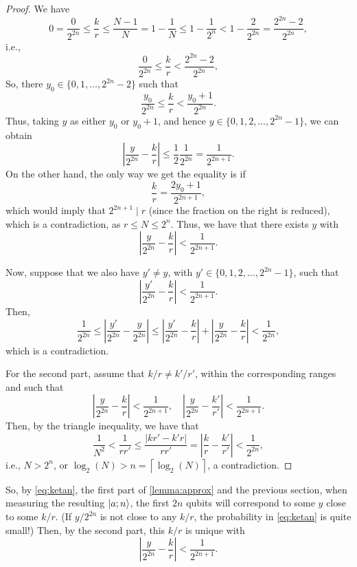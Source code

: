 \documentclass[12pt]{amsart}
\theoremstyle{plain}
\theoremstyle{definition}
\theoremstyle{remark}
\newcommand{\abs}[1]{\left| #1 \right|}
\newcommand{\ceil}[1]{\left\lceil{#1}\right\rceil}
\begin{document}
\begin{proof}
  We have
  \[
    0 = \frac{0}{2^{2n}} \leq \frac{k}{r} \leq \frac{N-1}{N} = 1 - \frac{1}{N} \leq 1 -  \frac{1}{2^n} < 1 - \frac{2}{2^{2n}} = \frac{2^{2n} - 2}{2^{2n}},
  \]
  i.e.,
  \[
     \frac{0}{2^{2n}} \leq \frac{k}{r} < \frac{2^{2n} - 2}{2^{2n}},
  \]
  So, there $y_0 \in \{0, 1, \ldots, 2^{2n}-2\}$ such that
  \[
    \frac{y_0}{2^{2n}} \leq \frac{k}{r} < \frac{y_0+1}{2^{2n}}.
  \]
  Thus, taking $y$ as either $y_0$ or $y_0 + 1$, and hence $y \in \{0, 1, 2, \ldots, 2^{2n} -1 \}$, we can obtain
  \[
    \abs{\frac{y}{2^{2n}} - \frac{k}{r}} \leq \frac{1}{2} \frac{1}{2^{2n}} = \frac{1}{2^{2n+1}}.
  \]
  On the other hand, the only way we get the equality is if
  \[
    \frac{k}{r} = \frac{2y_0 + 1}{2^{2n+1}},
  \]
  which would imply that $2^{2n+1} \mid r$ (since the fraction on the right is reduced), which is a contradiction, as $r \leq N \leq 2^{n}$.  Thus, we have that there exists $y$ with
  \[
    \abs{\frac{y}{2^{2n}} - \frac{k}{r}} < \frac{1}{2^{2n+1}}.
  \]

  Now, suppose that we also have $y' \neq y$, with $y' \in \{0, 1, 2, \ldots, 2^{2n}-1\}$, such that
  \[
    \abs{\frac{y'}{2^{2n}} - \frac{k}{r}} <  \frac{1}{2^{2n+1}}.
  \]
  Then,
  \[
     \frac{1}{2^{2n}} \leq \abs{\frac{y'}{2^{2n}} - \frac{y}{2^{2n}}} \leq \abs{\frac{y'}{2^{2n}} - \frac{k}{r}} + \abs{\frac{y}{2^{2n}} - \frac{k}{r}} < \frac{1}{2^{2n}},
   \]
   which is a contradiction.

   \bigskip

   For the second part, assume that $k/r \neq k'/r'$, within the corresponding ranges and such that
   \[
     \abs{\frac{y}{2^{2n}} - \frac{k}{r}} < \frac{1}{2^{2n+1}}, \quad     \abs{\frac{y}{2^{2n}} - \frac{k'}{r'}} < \frac{1}{2^{2n+1}}.
   \]
   Then, by the triangle inequality, we have that
   \[
     \frac{1}{N^2} < \frac{1}{rr'} \leq \frac{\abs{kr'-k'r}}{rr'} = \abs{\frac{k}{r} - \frac{k'}{r'}} < \frac{1}{2^{2n}},
   \]
   i.e., $N > 2^n$, or $\log_2(N) > n = \ceil{\log_2(N)}$, a contradiction.
\end{proof}

So, by \cref{eq:ketan}, the first part of \cref{lemma:approx} and the previous section, when measuring the resulting $\ket{a; n}$, the first $2n$ qubits will correspond to some $y$ close to some $k/r$.  (If $y/2^{2n}$ is not close to any $k/r$, the probability in \cref{eq:ketan} is quite small!)  Then, by the second part, this $k/r$ is unique with
\[
  \abs{\frac{y}{2^{2n}} - \frac{k}{r}} < \frac{1}{2^{2n + 1}}.
\]
\end{document}
